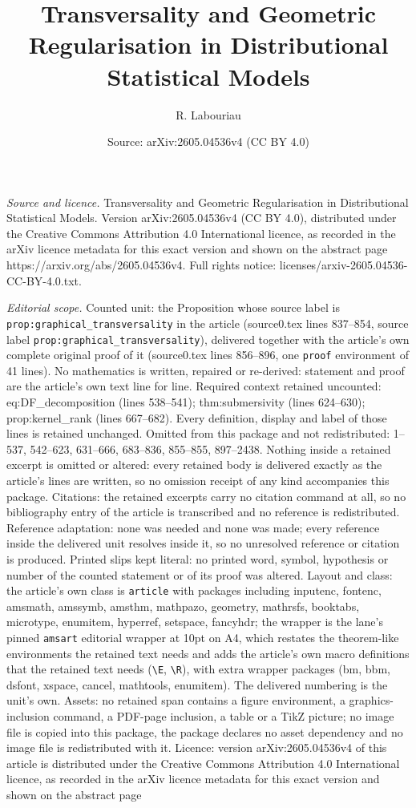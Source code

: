 \documentclass[10pt,a4paper]{amsart}
\title[Transversality and Geometric Regularisation in Distributiona]{Transversality and Geometric Regularisation in Distributional Statistical Models}
\author{R. Labouriau}
\date{Source: arXiv:2605.04536v4 (CC BY 4.0)}
\begin{document}
\maketitle

\noindent\emph{Source and licence.} Transversality and Geometric Regularisation in Distributional Statistical Models. Version arXiv:2605.04536v4 (CC BY 4.0), distributed under the Creative Commons Attribution 4.0 International licence, as recorded in the arXiv licence metadata for this exact version and shown on the abstract page https://arxiv.org/abs/2605.04536v4. Full rights notice: licenses/arxiv-2605.04536-CC-BY-4.0.txt.\par\smallskip

\noindent\textit{Editorial scope.} Counted unit: the Proposition whose source label is \texttt{prop:graphical\_transversality} in the article (source0.tex lines 837--854, source label \texttt{prop:graphical\_transversality}), delivered together with the article's own complete original proof of it (source0.tex lines 856--896, one \texttt{proof} environment of 41 lines). No mathematics is written, repaired or re-derived: statement and proof are the article's own text line for line. Required context retained uncounted: eq:DF\_decomposition (lines 538--541); thm:submersivity (lines 624--630); prop:kernel\_rank (lines 667--682). Every definition, display and label of those lines is retained unchanged. Omitted from this package and not redistributed: 1--537, 542--623, 631--666, 683--836, 855--855, 897--2438. Nothing inside a retained excerpt is omitted or altered: every retained body is delivered exactly as the article's lines are written, so no omission receipt of any kind accompanies this package. Citations: the retained excerpts carry no citation command at all, so no bibliography entry of the article is transcribed and no reference is redistributed. Reference adaptation: none was needed and none was made; every reference inside the delivered unit resolves inside it, so no unresolved reference or citation is produced. Printed slips kept literal: no printed word, symbol, hypothesis or number of the counted statement or of its proof was altered. Layout and class: the article's own class is \texttt{article} with packages including inputenc, fontenc, amsmath, amssymb, amsthm, mathpazo, geometry, mathrsfs, booktabs, microtype, enumitem, hyperref, setspace, fancyhdr; the wrapper is the lane's pinned \texttt{amsart} editorial wrapper at 10pt on A4, which restates the theorem-like environments the retained text needs and adds the article's own macro definitions that the retained text needs (\texttt{\textbackslash E}, \texttt{\textbackslash R}), with extra wrapper packages (bm, bbm, dsfont, xspace, cancel, mathtools, enumitem). The delivered numbering is the unit's own. Assets: no retained span contains a figure environment, a graphics-inclusion command, a PDF-page inclusion, a table or a TikZ picture; no image file is copied into this package, the package declares no asset dependency and no image file is redistributed with it. Licence: version arXiv:2605.04536v4 of this article is distributed under the Creative Commons Attribution 4.0 International licence, as recorded in the arXiv licence metadata for this exact version and shown on the abstract page 
\end{document}
